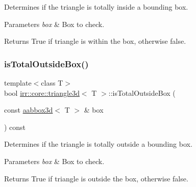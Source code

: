 Determines if the triangle is totally inside a bounding box. 


\begin{DoxyParams}{Parameters}
{\em box} & Box to check. \\
\hline
\end{DoxyParams}
\begin{DoxyReturn}{Returns}
True if triangle is within the box, otherwise false. 
\end{DoxyReturn}
\mbox{\label{classirr_1_1core_1_1triangle3d_ac191abc19290c4a7fcad9af3a5707bc1}} 
\subsubsection{\texorpdfstring{is\+Total\+Outside\+Box()}{isTotalOutsideBox()}\hspace{0.1cm}{\footnotesize\ttfamily [1/2]}}
{\footnotesize\ttfamily template$<$class T$>$ \\
bool \hyperlink{classirr_1_1core_1_1triangle3d}{irr\+::core\+::triangle3d}$<$ T $>$\+::is\+Total\+Outside\+Box (\begin{DoxyParamCaption}\item[{const \hyperlink{classirr_1_1core_1_1aabbox3d}{aabbox3d}$<$ T $>$ \&}]{box }\end{DoxyParamCaption}) const\hspace{0.3cm}{\ttfamily [inline]}}



Determines if the triangle is totally outside a bounding box. 


\begin{DoxyParams}{Parameters}
{\em box} & Box to check. \\
\hline
\end{DoxyParams}
\begin{DoxyReturn}{Returns}
True if triangle is outside the box, otherwise false. 
\end{DoxyReturn}
\mbox{\label{classirr_1_1core_1_1triangle3d_ac191abc19290c4a7fcad9af3a5707bc1}} 
